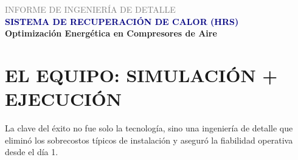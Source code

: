 \documentclass[11pt,letterpaper]{article}
\begin{document}
\thispagestyle{empty}

\begin{center}
    \vspace*{1cm}
    {\Large\textcolor{gray}{INFORME DE INGENIERÍA DE DETALLE}}\\[0.5cm]
    {\Huge\textbf{\textcolor{navy}{SISTEMA DE RECUPERACIÓN DE CALOR (HRS)}}}\\[0.5cm]
    {\Large\textcolor{royal}{\textbf{Optimización Energética en Compresores de Aire}}}\\[2cm]
\end{center}

\begin{center}
\end{center}

\vspace{1.5cm}

\section*{EL EQUIPO: SIMULACIÓN + EJECUCIÓN}
La clave del éxito no fue solo la tecnología, sino una ingeniería de detalle que eliminó los sobrecostos típicos de instalación y aseguró la fiabilidad operativa desde el día 1.
\end{document}
